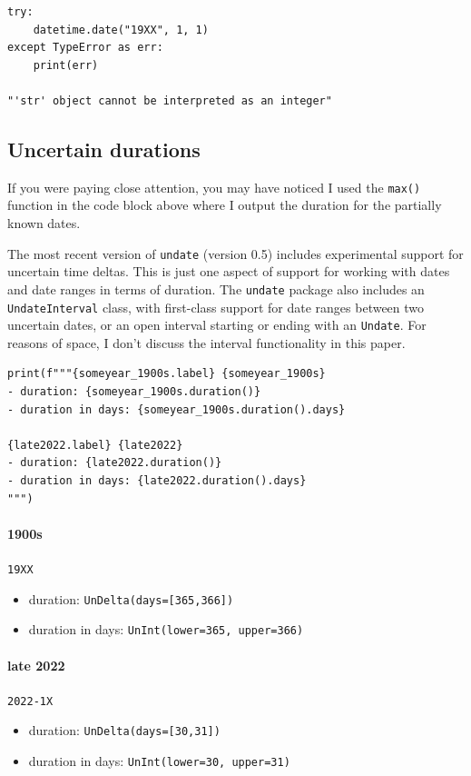 \documentclass[final]{anthology-ch} %
\begin{document}
\begin{verbatim}
try:
    datetime.date("19XX", 1, 1)
except TypeError as err:
    print(err)

"'str' object cannot be interpreted as an integer"
\end{verbatim}

\subsection{Uncertain durations}

If you were paying close attention, you may have noticed I used the \texttt{max()} function in the code block above where I output the duration for the partially known dates.

The most recent version of \texttt{undate} (version 0.5) includes experimental support for uncertain time deltas.  This is just one aspect of support for working with dates and date ranges in terms of duration.  The \texttt{undate} package also includes an \texttt{UndateInterval} class, with first-class support for date ranges between two uncertain dates, or an open interval starting or ending with an \texttt{Undate}. For reasons of space, I don't discuss the interval functionality in this paper.

\begin{verbatim}
print(f"""{someyear_1900s.label} {someyear_1900s}
- duration: {someyear_1900s.duration()}
- duration in days: {someyear_1900s.duration().days}

{late2022.label} {late2022}
- duration: {late2022.duration()}
- duration in days: {late2022.duration().days}
""")
\end{verbatim}

\paragraph{1900s} \texttt{19XX}
\begin{itemize}
    \item duration: \texttt{UnDelta(days=[365,366])}
    \item duration in days: \texttt{UnInt(lower=365, upper=366)}
\end{itemize}

\paragraph{late 2022} \texttt{2022-1X}
\begin{itemize}
    \item duration: \texttt{UnDelta(days=[30,31])}
    \item duration in days: \texttt{UnInt(lower=30, upper=31)}
\end{itemize}
    
\end{document}
